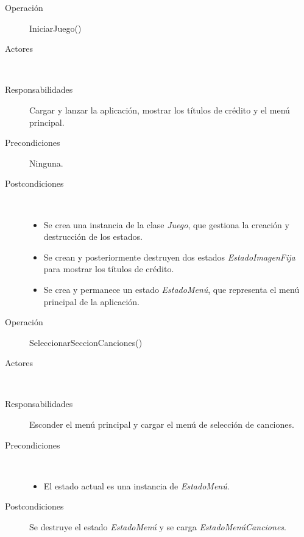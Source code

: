 \begin{description}
\item[Operación] IniciarJuego()
\item[Actores] \jugador\, \sistema\
\item[Responsabilidades] Cargar y lanzar la aplicación, mostrar los títulos de
  crédito y el menú principal.
\item[Precondiciones] Ninguna.
\item[Postcondiciones] $\quad$

  \begin{itemize}
  \item Se crea una instancia de la clase \textit{Juego}, que gestiona la
    creación y destrucción de los estados.
  \item Se crean y posteriormente destruyen dos estados
    \textit{EstadoImagenFija} para mostrar los títulos de crédito.
  \item Se crea y permanece un estado \textit{EstadoMenú}, que representa el
    menú principal de la aplicación.
  \end{itemize}

\end{description}

\begin{description}
\item[Operación] SeleccionarSeccionCanciones()
\item[Actores] \jugador\, \sistema\
\item[Responsabilidades] Esconder el menú principal y cargar el menú de
  selección de canciones.
\item[Precondiciones] $\quad$

  \begin{itemize}
  \item El estado actual es una instancia de \textit{EstadoMenú}.
  \end{itemize}

\item[Postcondiciones] Se destruye el estado \textit{EstadoMenú} y se carga
  \textit{EstadoMenúCanciones}.
\end{description}

